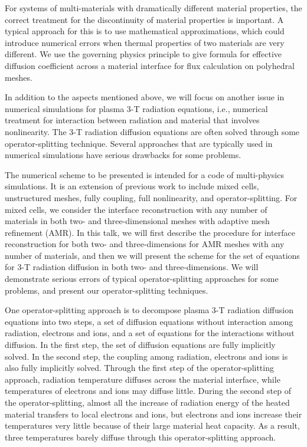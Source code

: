\documentclass{report}
\begin{document}
For systems of multi-materials with dramatically different material
properties, the correct treatment for the discontinuity of material
properties is important. A typical approach for this is to use
mathematical approximations, which could introduce numerical errors when
thermal properties of two materials are very different. We use the
governing physics principle to give formula for effective diffusion
coefficient across a material interface for flux calculation on
polyhedral meshes.

In addition to the aspects mentioned above, we will focus on another
issue in numerical simulations for plasma 3-T radiation equations, i.e.,
numerical treatment for interaction between radiation and material that
involves nonlinearity. The 3-T radiation diffusion equations are often
solved through some operator-splitting technique. Several approaches that
are typically used in numerical simulations have serious drawbacks for
some problems.

The numerical scheme to be presented is intended for a code of
multi-physics simulations. It is an extension of previous work to include
mixed cells, unstructured meshes, fully coupling, full nonlinearity, and
operator-splitting. For mixed cells, we consider the interface
reconstruction with any number of materials in both two- and
three-dimensional meshes with adaptive mesh refinement (AMR). In this
talk, we will first describe the procedure for interface reconstruction
for both two- and three-dimensions for AMR meshes with any number of
materials, and then we will present the scheme for the set of equations
for 3-T radiation diffusion in both two- and three-dimensions. We will
demonstrate serious errors of typical operator-splitting approaches for
some problems, and present our operator-splitting techniques.

One operator-splitting approach is to decompose plasma 3-T radiation
diffusion equations into two steps, a set of diffusion equations without
interaction among radiation, electrons and ions, and a set of equations
for the interactions without diffusion. In the first step, the set of
diffusion equations are fully implicitly solved. In the second step, the
coupling among radiation, electrons and ions is also fully implicitly
solved. Through the first step of the operator-splitting approach,
radiation temperature diffuses across the material interface, while
temperatures of electrons and ions may diffuse little. During the second
step of the operator-splitting, almost all the increase of radiation
energy of the heated material transfers to local electrons and ions, but
electrons and ions increase their temperatures very little because of
their large material heat capacity. As a result, three temperatures
barely diffuse through this operator-splitting approach.
\end{document}
